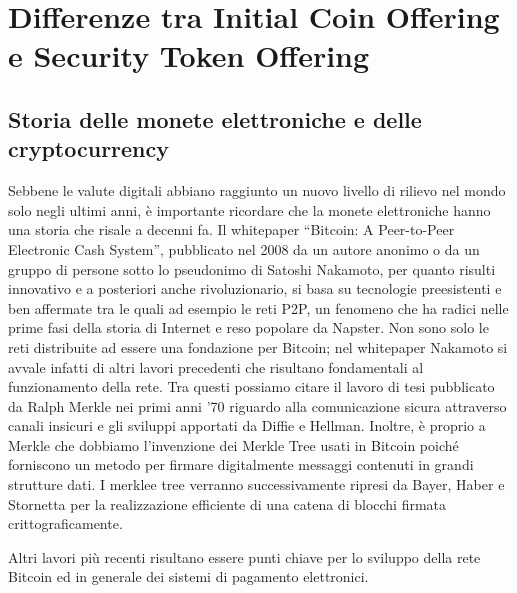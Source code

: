 \chapter{Differenze tra Initial Coin Offering e Security Token Offering}                %
\lhead[\fancyplain{}{\bfseries\thepage}]{\fancyplain{}{\bfseries\rightmark}}


\section{Storia delle monete elettroniche e delle cryptocurrency}

Sebbene le valute digitali abbiano raggiunto un nuovo livello di rilievo nel mondo solo negli ultimi anni, è importante ricordare che la monete elettroniche hanno una storia che risale a decenni fa. Il whitepaper “Bitcoin: A Peer-to-Peer Electronic Cash System”, pubblicato nel 2008 da un autore anonimo o da un gruppo di persone sotto lo pseudonimo di Satoshi Nakamoto, per quanto risulti innovativo e a posteriori anche rivoluzionario, si basa su tecnologie preesistenti e ben affermate tra le quali ad esempio le reti P2P, un fenomeno che ha radici nelle prime fasi della storia di Internet e reso popolare da Napster. Non sono solo le reti distribuite ad essere una fondazione per Bitcoin; nel whitepaper Nakamoto si avvale infatti di altri lavori precedenti che risultano fondamentali al funzionamento della rete. Tra questi possiamo citare il lavoro di tesi pubblicato da Ralph Merkle nei primi anni ’70  riguardo alla comunicazione sicura attraverso canali insicuri e gli sviluppi apportati da Diffie e Hellman. Inoltre, è proprio a Merkle che dobbiamo l’invenzione dei Merkle Tree usati in Bitcoin poiché forniscono un metodo per firmare digitalmente messaggi contenuti in grandi strutture dati. I merklee tree verranno successivamente ripresi da Bayer, Haber e Stornetta per la realizzazione efficiente di una catena di blocchi firmata crittograficamente.


Altri lavori più recenti risultano essere punti chiave per lo sviluppo della rete Bitcoin ed in generale dei sistemi di pagamento elettronici.



